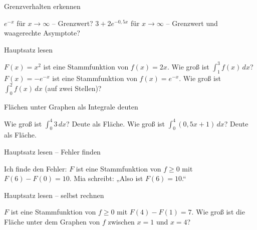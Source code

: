 \setcounter{aufgabe}{0}

\begin{aufgabe}{Grenzverhalten erkennen}
\begin{teile}
\teil $e^{-x}$ für $x \to \infty$ – Grenzwert? \leerfeld
\teil $3 + 2e^{-0{,}5x}$ für $x \to \infty$ – Grenzwert und waagerechte Asymptote?
\end{teile}
\end{aufgabe}

\begin{aufgabe}{Hauptsatz lesen}
\begin{teile}
\teil $F(x) = x^2$ ist eine Stammfunktion von $f(x) = 2x$. Wie groß ist $∫_1^3 f(x)\,dx$? \leerfeld
\teil $F(x) = -e^{-x}$ ist eine Stammfunktion von $f(x) = e^{-x}$. Wie groß ist $∫_0^2 f(x)\,dx$ (auf zwei Stellen)? \leerfeld
\end{teile}
\end{aufgabe}

\begin{aufgabe}{Flächen unter Graphen als Integrale deuten}
\begin{teile}
\teil Wie groß ist $∫_0^4 3\,dx$? Deute als Fläche. \leerfeld
\teil Wie groß ist $∫_0^4 (0{,}5x + 1)\,dx$? Deute als Fläche. \leerfeld
\end{teile}
\end{aufgabe}

\begin{aufgabe}{Hauptsatz lesen – Fehler finden}
\begin{teile}
\teil Ich finde den Fehler: $F$ ist eine Stammfunktion von $f \ge 0$ mit $F(6) - F(0) = 10$. Mia schreibt: „Also ist $F(6) = 10$.“
\end{teile}
\end{aufgabe}

\begin{aufgabe}{Hauptsatz lesen – selbst rechnen}
\begin{teile}
\teil $F$ ist eine Stammfunktion von $f \ge 0$ mit $F(4) - F(1) = 7$. Wie groß ist die Fläche unter dem Graphen von $f$ zwischen $x = 1$ und $x = 4$? \leerfeld
\end{teile}
\end{aufgabe}
